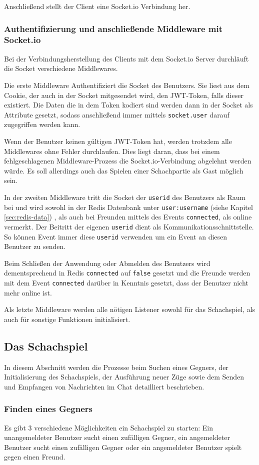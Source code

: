 Anschließend stellt der Client eine Socket.io Verbindung her.

\subsubsection{Authentifizierung und anschließende Middleware mit Socket.io}
\label{sec:socketauth}
Bei der Verbindungsherstellung des Clients mit dem Socket.io Server durchläuft die Socket verschiedene Middlewares.

Die erste Middleware Authentifiziert die Socket des Benutzers. Sie liest aus dem Cookie, der auch in der Socket mitgesendet wird, den JWT-Token, falls dieser existiert. Die Daten die in dem Token kodiert sind werden dann in der Socket als Attribute gesetzt, sodass anschließend immer mittels \verb|socket.user| darauf zugegriffen werden kann.

Wenn der Benutzer keinen gültigen JWT-Token hat, werden trotzdem alle Middlewares ohne Fehler durchlaufen. Dies liegt daran, dass bei einem fehlgeschlagenen Middleware-Prozess die Socket.io-Verbindung abgelehnt werden würde. Es soll allerdings auch das Spielen einer Schachpartie als Gast möglich sein.

In der zweiten Middleware tritt die Socket der \verb|userid| des Benutzers als Raum bei und wird sowohl in der Redis Datenbank unter \verb|user:username| (siehe Kapitel \ref{sec:redis-data}) , als auch bei Freunden mittels des Events \verb|connected|, als online vermerkt.
Der Beitritt der eigenen \verb|userid| dient als Kommunikationsschnittstelle. So können Event immer diese \verb|userid| verwenden um ein Event an diesen Benutzer zu senden.

Beim Schließen der Anwendung oder Abmelden des Benutzers wird dementsprechend in Redis \verb|connected| auf \verb|false| gesetzt und die Freunde werden mit dem Event \verb|connected| darüber in Kenntnis gesetzt, dass der Benutzer nicht mehr online ist.

Als letzte Middleware werden alle nötigen Listener sowohl für das Schachspiel, als auch für sonstige Funktionen initialisiert.
\subsection{Das Schachspiel}
\label{sec:Schach-Backend}
In diesem Abschnitt werden die Prozesse beim Suchen eines Gegners, der Initialisierung des Schachspiels, der Ausführung neuer Züge sowie dem Senden und Empfangen von Nachrichten im Chat detailliert beschrieben.
\subsubsection{Finden eines Gegners}
\label{sec:find_game}
Es gibt 3 verschiedene Möglichkeiten ein Schachspiel zu starten: Ein unangemeldeter Benutzer sucht einen zufälligen Gegner, ein angemeldeter Benutzer sucht einen zufälligen Gegner oder ein angemeldeter Benutzer spielt gegen einen Freund.

